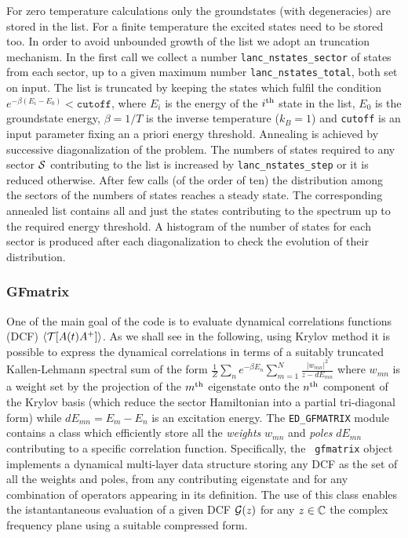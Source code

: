 \documentclass[preprint,3p,10pt]{elsarticle}
\def\TT{{\cal T}}\def\NN{{\cal N}}\def\BB{{\cal B}} \def\II{{\cal I}}
\def\GG{{\cal G}} \def\SS{{\cal S}}
\def\ibra{\langle}
\def\iket{\rangle}
\begin{document}
For zero temperature calculations only the groundstates (with degeneracies) are stored
in the list.
For a finite temperature the excited states need to be stored too.
In order to avoid unbounded growth of the list we adopt an 
truncation mechanism. In the first call we collect a number 
\texttt{lanc\_nstates\_sector} of states from each sector, up to a
given maximum number \texttt{lanc\_nstates\_total}, both set on input.  
The list is truncated by keeping the states which
fulfil the condition $e^{-\beta(E_i-E_0)} < \mathtt{cutoff}$, where
$E_i$ is the energy of the $i^{\rm th}$ state in the list, $E_0$ is the
groundstate energy,  $\beta=1/T$ is the inverse temperature ($k_B=1$) and \texttt{cutoff}
is an input parameter fixing an a priori energy threshold.
%  
Annealing is achieved by successive diagonalization of the problem.
The numbers of states required to any sector $\SS$ contributing to the list is increased by
\texttt{lanc\_nstates\_step} or it is reduced otherwise. After few calls
(of the order of ten) the distribution among the sectors of the
numbers of states reaches a steady state.
The corresponding annealed list contains all and just the states
contributing to the spectrum up to the required energy threshold.
A histogram of the number of states for each sector is produced after
each diagonalization to check the evolution of their distribution.



\subsubsection{GFmatrix}
One of the main goal of the code is to evaluate dynamical correlations
functions (DCF) $\ibra \TT[ A(t) A^+ ]\iket$. As we shall see in the following, using Krylov method it is
possible to express the dynamical correlations in terms of a suitably
truncated Kallen-Lehmann spectral sum of the form
$\tfrac{1}{Z}\sum_n e^{-\beta E_n} \sum_{m=1}^{N} \tfrac{|w_{mn}|^2}{ z
  - dE_{mn}}$ where $w_{mn}$ is a weight set by the 
projection of the $m^{\rm th}$ eigenstate onto the $n^{\rm th}$
component of the Krylov basis (which reduce the sector Hamiltonian
into a partial tri-diagonal form) while $dE_{mn}=E_m-E_n$ is an excitation energy. 
The {\tt ED\_GFMATRIX} module contains a class which efficiently store all
the {\it weights} $w_{mn}$ and {\it poles} $dE_{mn}$ contributing to
a specific correlation function. Specifically, the {\tt
  gfmatrix} object implements a dynamical multi-layer data structure
storing any DCF as the set of all the weights and poles,
from any contributing eigenstate  and for any
combination of operators appearing in its definition.
The use of this class enables the istantantaneous evaluation of a
given  DCF  $\GG(z)$ for any $z\in\mathbb{C}$ the complex frequency plane
using a suitable compressed form. 
  
\end{document}
